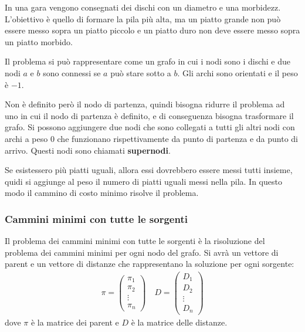 \documentclass[a4paper]{article}
\begin{document}
\begin{exercise}
  In una gara vengono consegnati dei dischi con un diametro e una morbidezz.
  L'obiettivo è quello di formare la pila più alta, ma un piatto grande non può essere
  messo sopra un piatto piccolo e un piatto duro non deve essere messo sopra un piatto
  morbido.

  \vspace{1em}
  \noindent
  Il problema si può rappresentare come un grafo in cui i nodi sono i dischi e due
  nodi \( a \) e \( b \) sono connessi se \( a \) può stare sotto a \( b \). Gli
  archi sono orientati e il peso è \( -1 \).

  \vspace{1em}
  \noindent
  Non è definito però il nodo di partenza, quindi bisogna ridurre il problema ad uno
  in cui il nodo di partenza è definito, e di conseguenza bisogna trasformare il grafo.
  Si possono aggiungere due nodi che sono collegati a tutti gli altri nodi con archi
  a peso 0 che funzionano rispettivamente da punto di partenza e da punto di arrivo.
  Questi nodi sono chiamati \textbf{supernodi}.

  \vspace{1em}
  \noindent
  Se esistessero più piatti uguali, allora essi dovrebbero essere messi tutti insieme,
  quidi si aggiunge al peso il numero di piatti uguali messi nella pila. In questo
  modo il cammino di costo minimo risolve il problema.
\end{exercise}

\subsubsection{Cammini minimi con tutte le sorgenti}
Il problema dei cammini minimi con tutte le sorgenti è la risoluzione del problema
dei cammini minimi per ogni nodo del grafo. Si avrà un vettore di parent e un vettore
di distanze che rappresentano la soluzione per ogni sorgente:
\[
  \begin{aligned}
    \pi = \begin{pmatrix} 
      \pi_1\\
      \pi_2\\
      \vdots\\
      \pi_n
    \end{pmatrix} 
    \quad
    D = \begin{pmatrix} 
      D_1\\
      D_2\\
      \vdots\\
      D_n
    \end{pmatrix}
  \end{aligned}
\] 
dove \( \pi \) è la matrice dei parent e \( D \) è la matrice delle distanze.
\end{document}
